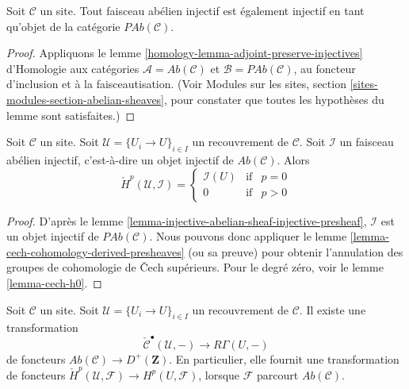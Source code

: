 \begin{lemma}
\label{lemma-injective-abelian-sheaf-injective-presheaf}
Soit $\mathcal{C}$ un site. Tout faisceau abélien injectif est également
injectif en tant qu'objet de la catégorie $\textit{PAb}(\mathcal{C})$.
\end{lemma}

\begin{proof}
Appliquons le lemme \ref{homology-lemma-adjoint-preserve-injectives}
d'Homologie aux catégories $\mathcal{A} = \textit{Ab}(\mathcal{C})$ et
$\mathcal{B} = \textit{PAb}(\mathcal{C})$, au foncteur d'inclusion et à la
faisceautisation. (Voir Modules sur les sites, section
\ref{sites-modules-section-abelian-sheaves}, pour constater que toutes les
hypothèses du lemme sont satisfaites.)
\end{proof}

\begin{lemma}
\label{lemma-injective-trivial-cech}
Soit $\mathcal{C}$ un site.
Soit $\mathcal{U} = \{U_i \to U\}_{i \in I}$ un recouvrement de
$\mathcal{C}$. Soit $\mathcal{I}$ un faisceau abélien injectif, c'est-à-dire
un objet injectif de $\textit{Ab}(\mathcal{C})$. Alors
$$
\check{H}^p(\mathcal{U}, \mathcal{I}) =
\left\{
\begin{matrix}
\mathcal{I}(U) & \text{if} & p = 0 \\
0 & \text{if} & p > 0
\end{matrix}
\right.
$$
\end{lemma}

\begin{proof}
D'après le lemme \ref{lemma-injective-abelian-sheaf-injective-presheaf},
$\mathcal{I}$ est un objet injectif de $\textit{PAb}(\mathcal{C})$.
Nous pouvons donc appliquer le
lemme \ref{lemma-cech-cohomology-derived-presheaves} (ou sa preuve) pour
obtenir l'annulation des groupes de cohomologie de {\v C}ech supérieurs.
Pour le degré zéro, voir le lemme \ref{lemma-cech-h0}.
\end{proof}

\begin{lemma}
\label{lemma-cech-cohomology}
Soit $\mathcal{C}$ un site.
Soit $\mathcal{U} = \{U_i \to U\}_{i \in I}$ un recouvrement de
$\mathcal{C}$. Il existe une transformation
$$
\check{\mathcal{C}}^\bullet(\mathcal{U}, -)
\longrightarrow
R\Gamma(U, -)
$$
de foncteurs $\textit{Ab}(\mathcal{C}) \to D^{+}(\mathbf{Z})$.
En particulier, elle fournit une transformation de foncteurs
$\check{H}^p(\mathcal{U}, \mathcal{F}) \to H^p(U, \mathcal{F})$, lorsque
$\mathcal{F}$ parcourt $\textit{Ab}(\mathcal{C})$.
\end{lemma}

